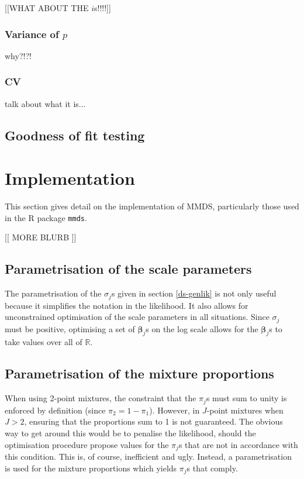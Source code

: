 [[WHAT ABOUT THE $i$s!!!!]]


\subsubsection{Variance of $p$}
why?!?!



\subsubsection{CV}
talk about what it is...


\subsection{Goodness of fit testing}





\section{Implementation}
This section gives detail on the implementation of MMDS, particularly those used in the \textsf{R} package \texttt{mmds}.

[[ MORE BLURB ]]

\subsection{Parametrisation of the scale parameters}
The parametrisation of the $\sigma_j$s given in section \ref{ds-genlik} is not only useful because it simplifies the notation in the likelihood. It also allows for unconstrained optimisation of the scale parameters in all situations. Since $\sigma_j$ must be positive, optimising a set of $\bm{\beta}_j$s on the log scale allows for the $\bm{\beta}_j$s to take values over all of $\mathbb{R}$.


\subsection{Parametrisation of the mixture proportions}
When using 2-point mixtures, the constraint that the $\pi_j$s must sum to unity is enforced by definition (since $\pi_2=1-\pi_1$). However, in $J$-point mixtures when $J>2$, ensuring that the proportions sum to 1 is not guaranteed. The obvious way to get around this would be to penalise the likelihood, should the optimisation procedure propose values for the $\pi_j$s that are not in accordance with this condition. This is, of course, inefficient and ugly. Instead, a parametrisation is used for the mixture proportions which yields $\pi_j$s that comply.

